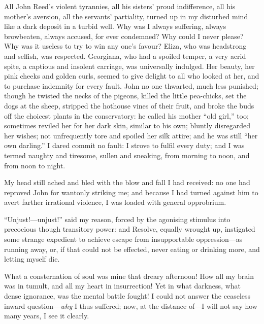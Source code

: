 All John Reed's violent tyrannies, all his sisters' proud indifference,
all his mother's aversion, all the servants' partiality, turned up in my
disturbed mind like a dark deposit in a turbid well.  Why was I always
suffering, always browbeaten, always accused, for ever condemned?  Why
could I never please?  Why was it useless to try to win any one's
favour?  Eliza, who was headstrong and selfish, was respected. 
Georgiana, who had a spoiled temper, a very acrid spite, a captious and
insolent carriage, was universally indulged.  Her beauty, her pink
cheeks and golden curls, seemed to give delight to all who looked at
her, and to purchase indemnity for every fault.  John no one thwarted,
much less punished; though he twisted the necks of the pigeons, killed
the little pea-chicks, set the dogs at the sheep, stripped the hothouse
vines of their fruit, and broke the buds off the choicest plants in the
conservatory: he called his mother \enquote{old girl,} too; sometimes
reviled her for her dark skin, similar to his own; bluntly disregarded
her wishes; not unfrequently tore and spoiled her silk attire; and he
was still \enquote{her own darling.}  I dared commit no fault: I strove
to fulfil every duty; and I was termed naughty and tiresome, sullen and
sneaking, from morning to noon, and from noon to night.

My head still ached and bled with the blow and fall I had received: no
one had reproved John for wantonly striking me; and because I had turned
against him to avert farther irrational violence, I was loaded with
general opprobrium.

\enquote{Unjust!---unjust!} said my reason, forced by the agonising
stimulus into precocious though transitory power: and Resolve, equally
wrought up, instigated some strange expedient to achieve escape from
insupportable oppression---as running away, or, if that could not be
effected, never eating or drinking more, and letting myself die.

What a consternation of soul was mine that dreary afternoon!  How all my
brain was in tumult, and all my heart in insurrection!  Yet in what
darkness, what dense ignorance, was the mental battle fought!  I could
not answer the ceaseless inward question---\emph{why} I thus suffered;
now, at the distance of---I will not say how many years, I see it
clearly.

